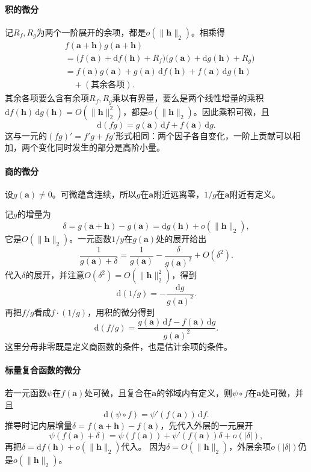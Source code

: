 \paragraph{积的微分}
记$R_f,R_g$为两个一阶展开的余项，都是$o(\lVert\bm h\rVert_2)$。相乘得
\[
 \begin{aligned}
 &f(\bm a+\bm h)g(\bm a+\bm h)\\
 &=\bigl(f(\bm a)+\mathrm df(\bm h)+R_f\bigr)\bigl(g(\bm a)+\mathrm dg(\bm h)+R_g\bigr)\\
 &=f(\bm a)g(\bm a)+g(\bm a)\,\mathrm df(\bm h)+f(\bm a)\,\mathrm dg(\bm h)\\
 &\quad+(\text{其余各项}).
 \end{aligned}
\]
其余各项要么含有余项$R_f,R_g$乘以有界量，要么是两个线性增量的乘积$\mathrm df(\bm h)\,\mathrm dg(\bm h)=O(\lVert\bm h\rVert_2^2)$，都是$o(\lVert\bm h\rVert_2)$。因此乘积可微，且
\begin{equation}
 \mathrm d(fg)=g(\bm a)\,\mathrm df+f(\bm a)\,\mathrm dg.
\label{eq:multivariable-product-rule-differential}
\end{equation}
这与一元的$(fg)'=f'g+fg'$形式相同：两个因子各自变化，一阶上贡献可以相加，两个变化同时发生的部分是高阶小量。

\paragraph{商的微分}
设$g(\bm a)\neq0$。可微蕴含连续，所以$g$在$\bm a$附近远离零，$1/g$在$\bm a$附近有定义。

记$g$的增量为
\[
 \delta=g(\bm a+\bm h)-g(\bm a)=\mathrm dg(\bm h)+o(\lVert\bm h\rVert_2),
\]
它是$O(\lVert\bm h\rVert_2)$。一元函数$1/y$在$g(\bm a)$处的展开给出
\[
 \frac1{g(\bm a)+\delta}=\frac1{g(\bm a)}-\frac{\delta}{g(\bm a)^2}+O(\delta^2).
\]
代入$\delta$的展开，并注意$O(\delta^2)=O(\lVert\bm h\rVert_2^2)$，得到
\[
 \mathrm d(1/g)=-\frac{\mathrm dg}{g(\bm a)^2}.
\]
再把$f/g$看成$f\cdot(1/g)$，用积的微分得到
\begin{equation}
 \mathrm d(f/g)=\frac{g(\bm a)\,\mathrm df-f(\bm a)\,\mathrm dg}{g(\bm a)^2}.
\label{eq:multivariable-quotient-rule-differential}
\end{equation}
这里分母非零既是定义商函数的条件，也是估计余项的条件。

\paragraph{标量复合函数的微分}
若一元函数$\psi$在$f(\bm a)$处可微，且复合在$\bm a$的邻域内有定义，则$\psi\circ f$在$\bm a$处可微，并且
\begin{equation}
 \mathrm d(\psi\circ f)=\psi'(f(\bm a))\,\mathrm df.
\label{eq:multivariable-scalar-composite-differential}
\end{equation}
推导时记内层增量$\delta=f(\bm a+\bm h)-f(\bm a)$，先代入外层的一元展开
\[
 \psi(f(\bm a)+\delta)=\psi(f(\bm a))+\psi'(f(\bm a))\delta+o(|\delta|),
\]
再把$\delta=\mathrm df(\bm h)+o(\lVert\bm h\rVert_2)$代入。
因为$\delta=O(\lVert\bm h\rVert_2)$，外层余项$o(|\delta|)$仍是$o(\lVert\bm h\rVert_2)$。

